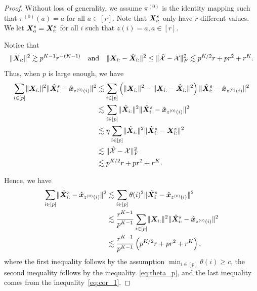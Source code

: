 \documentclass[lettersize,onecolumn,journal]{IEEEtran}
\theoremstyle{definition}
\theoremstyle{definition}
\newcommand{\of}[1]{\left(#1\right)}
\begin{document}
\begin{proof} 

{
\color{blue}
Without loss of generality, we assume $\pi^{(0)}$ is the identity mapping such that  $\pi^{(0)}(a) = a$ for all $ a \in [r]$. Note that $\bm X_{i:}^s$ only have $r$ different values. We let $\bm X_a^s = \bm X_{i:}^s$ for all $i$ such that $z(i) = a, a \in [r]$. 

Notice that 
\begin{equation}
    \lVert\bm X_{i:}\rVert^2 \gtrsim p^{K-1} r^{-(K-1)} \quad \text{and} \quad \lVert\bm X_{i:} - \hat {\bm X}_{i:}\rVert^2 \leq \lVert\hat {\mathcal{X}} - \mathcal{X}\rVert_F^2 \lesssim  p^{K/2}r + pr^2 + r^K .
\end{equation}
Thus, when $p$ is large enough, we have 
\begin{align}
    \sum_{i \in [p]} \onormSize{}{\mX_{i:}}^2 \onormSize{}{\hat \mX_i^s - \hat \mx_{z^{(0)}(i)}}^2 &\lesssim \sum_{i \in [p]} \of{\onormSize{}{\mX_{i:}}^2 - \onormSize{}{\mX_{i:} - \hat \mX_{i:}}^2} \onormSize{}{\hat \mX_{i:}^s - \hat \mx_{z^{(0)}(i)}}^2\\
   & \lesssim \sum_{i \in [p]} \onormSize{}{\hat \mX_{i:}}^2 \onormSize{}{\hat \mX_{i:}^s - \hat \mx_{z^{(0)}(i)}}^2 \\
   & \lesssim \eta  \sum_{i \in [p]} \onormSize{}{\hat \mX_{i:}}^2 \onormSize{}{\hat \mX_{i:}^s - \mX_{i:}^s}^2 \\
   & \lesssim \onormSize{}{\hat \tX - \tX}_F^2 \\
   & \lesssim p^{K/2}r + pr^2 + r^K .\label{eq:cor_1}
\end{align}

Hence, we have 
\begin{align}
    \sum_{i \in [p]} \onormSize{}{\hat \mX_{i:}^s - \hat \mx_{z^{(0)}(i)}}^2 &\lesssim \sum_{i \in [p]} \theta(i)^2 \onormSize{}{\hat \mX_i^s - \hat \mx_{z^{(0)}(i)}}^2 \\
    &\lesssim \frac{r^{K-1}}{p^{K-1}} \sum_{i \in [p]} \onormSize{}{\mX_{i:}}^2 \onormSize{}{\hat \mX_{i:}^s - \hat \mx_{z^{(0)}(i)}}^2\\
    & \lesssim \frac{r^{K-1}}{p^{K-1}} \of{ p^{K/2}r + pr^2 + r^K },\label{eq:cor_2}
\end{align}
where the first inequality follows by the assumption $\min_{i \in [p]} \theta(i) \geq c$, the second inequality follows by the inequality~\eqref{eq:theta_p}, and the last inequality comes from the inequality~\eqref{eq:cor_1}.

}
\end{proof}
\end{document}
